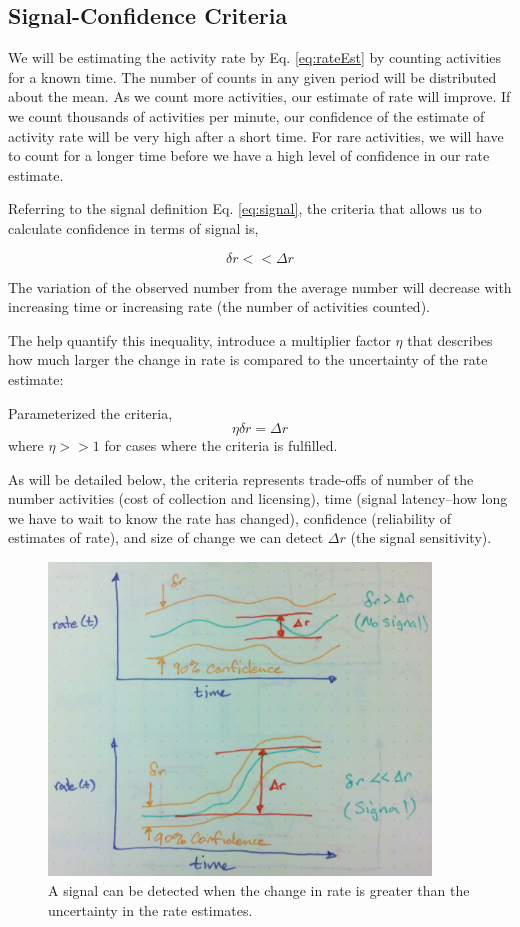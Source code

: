 \documentclass{article}
\begin{document}
\subsection{Signal-Confidence Criteria}

We will be estimating the activity rate by Eq. \ref{eq:rateEst} by counting activities for a known time.  The number of counts in any given period will be distributed about the mean. As we count more activities, our estimate of rate will improve.  If we count thousands of activities per minute, our confidence of the estimate of activity rate will be very high after a short time.  For rare activities, we will have to count for a longer time before we have a high level of confidence in our rate estimate.

Referring to the signal definition Eq. \ref{eq:signal}, the criteria that allows us to calculate confidence in terms of signal is, 

\begin{equation}
    \label{eq:criteria}
    \delta r << \Delta r
\end{equation}

The variation of the observed number from the average number will decrease with increasing time or increasing rate (the number of activities counted).

The help quantify this inequality, introduce a multiplier factor $\eta$ that describes how much larger the change in rate is compared to the uncertainty of the rate estimate:

Parameterized the criteria,
\begin{equation}
    \label{eq:criteriaParam}
    \eta \delta r = \Delta r
\end{equation}
where $\eta >> 1$ for cases where the criteria is fulfilled.

As will be detailed below, the criteria represents trade-offs of number of the number activities (cost of collection and licensing), time (signal latency--how long we have to wait to know the rate has changed), confidence (reliability of estimates of rate), and size of change we can detect $\Delta r$ (the signal sensitivity).  

\begin{figure}
    \centering
    \includegraphics[width=4.0in]{./imgs/signal.jpg}
        \caption{A signal can be detected when the change in rate is greater than the uncertainty in the rate estimates.}
    \label{fig:signal}
\end{figure}
\end{document}
